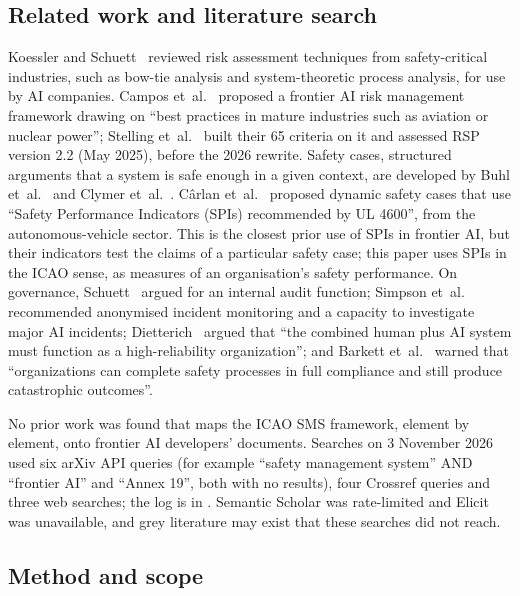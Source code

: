 \documentclass[11pt]{article}
\begin{document}
\subsection{Related work and literature search}\label{sec:related}

Koessler and Schuett~\cite{koessler2023} reviewed risk assessment techniques from safety-critical industries, such as bow-tie analysis and system-theoretic process analysis, for use by AI companies. Campos et~al.~\cite{campos2025} proposed a frontier AI risk management framework drawing on ``best practices in mature industries such as aviation or nuclear power''; Stelling et~al.~\cite{stelling2025} built their 65 criteria on it and assessed RSP version 2.2 (May 2025), before the 2026 rewrite. Safety cases, structured arguments that a system is safe enough in a given context, are developed by Buhl et~al.~\cite{buhl2024} and Clymer et~al.~\cite{clymer2024}. Cârlan et~al.~\cite{carlan2024} proposed dynamic safety cases that use ``Safety Performance Indicators (SPIs) recommended by UL 4600'', from the autonomous-vehicle sector. This is the closest prior use of SPIs in frontier AI, but their indicators test the claims of a particular safety case; this paper uses SPIs in the ICAO sense, as measures of an organisation's safety performance. On governance, Schuett~\cite{schuett2025} argued for an internal audit function; Simpson et~al.~\cite{simpson2025} recommended anonymised incident monitoring and a capacity to investigate major AI incidents; Dietterich~\cite{dietterich2019} argued that ``the combined human plus AI system must function as a high-reliability organization''; and Barkett et~al.~\cite{barkett2026} warned that ``organizations can complete safety processes in full compliance and still produce catastrophic outcomes''.

No prior work was found that maps the ICAO SMS framework, element by element, onto frontier AI developers' documents. Searches on 3 November 2026 used six arXiv API queries (for example ``safety management system'' AND ``frontier AI'' and ``Annex 19'', both with no results), four Crossref queries and three web searches; the log is in . Semantic Scholar was rate-limited and Elicit was unavailable, and grey literature may exist that these searches did not reach.

\subsection{Method and scope}\label{sec:method}
\end{document}
